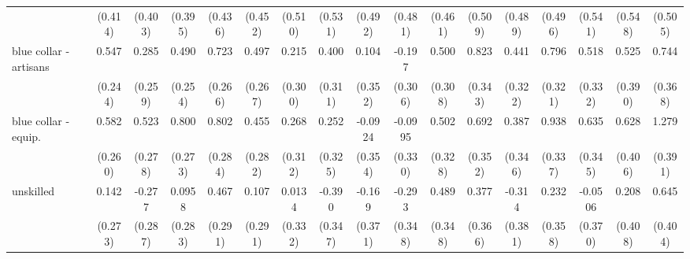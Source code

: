 {\begin{tabular}{l*{16}{c}}
                    &     (0.414)         &     (0.403)         &     (0.395)         &     (0.436)         &     (0.452)         &     (0.510)         &     (0.531)         &     (0.492)         &     (0.481)         &     (0.461)         &     (0.509)         &     (0.489)         &     (0.496)         &     (0.541)         &     (0.548)         &     (0.505)         \\
[1em]
blue collar - artisans&       0.547\sym{*}  &       0.285         &       0.490         &       0.723\sym{**} &       0.497         &       0.215         &       0.400         &       0.104         &      -0.197         &       0.500         &       0.823\sym{*}  &       0.441         &       0.796\sym{*}  &       0.518         &       0.525         &       0.744\sym{*}  \\
                    &     (0.244)         &     (0.259)         &     (0.254)         &     (0.266)         &     (0.267)         &     (0.300)         &     (0.311)         &     (0.352)         &     (0.306)         &     (0.308)         &     (0.343)         &     (0.322)         &     (0.321)         &     (0.332)         &     (0.390)         &     (0.368)         \\
[1em]
blue collar - equip.&       0.582\sym{*}  &       0.523         &       0.800\sym{**} &       0.802\sym{**} &       0.455         &       0.268         &       0.252         &     -0.0924         &     -0.0995         &       0.502         &       0.692\sym{*}  &       0.387         &       0.938\sym{**} &       0.635         &       0.628         &       1.279\sym{**} \\
                    &     (0.260)         &     (0.278)         &     (0.273)         &     (0.284)         &     (0.282)         &     (0.312)         &     (0.325)         &     (0.354)         &     (0.330)         &     (0.328)         &     (0.352)         &     (0.346)         &     (0.337)         &     (0.345)         &     (0.406)         &     (0.391)         \\
[1em]
unskilled           &       0.142         &      -0.277         &      0.0958         &       0.467         &       0.107         &      0.0134         &      -0.390         &      -0.169         &      -0.293         &       0.489         &       0.377         &      -0.314         &       0.232         &     -0.0506         &       0.208         &       0.645         \\
                    &     (0.273)         &     (0.287)         &     (0.283)         &     (0.291)         &     (0.291)         &     (0.332)         &     (0.347)         &     (0.371)         &     (0.348)         &     (0.348)         &     (0.366)         &     (0.381)         &     (0.358)         &     (0.370)         &     (0.408)         &     (0.404)         \\

\end{tabular}}
